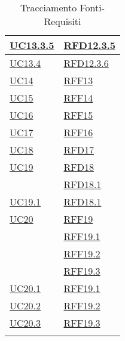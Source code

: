 \begin{longtable}{|>{\centering}m{5cm}|m{5cm}<{\centering}|}
\hyperref[UC13.3.5]{UC13.3.5} & \hyperlink{RFD12.3.5}{RFD12.3.5}\\ \hline
\hyperref[UC13.4]{UC13.4} & \hyperlink{RFD12.3.6}{RFD12.3.6}\\ \hline
\hyperref[UC14]{UC14} & \hyperlink{RFF13}{RFF13}\\ \hline
\hyperref[UC15]{UC15} & \hyperlink{RFF14}{RFF14}\\ \hline
\hyperref[UC16]{UC16} & \hyperlink{RFF15}{RFF15}\\ \hline
\hyperref[UC17]{UC17} & \hyperlink{RFF16}{RFF16}\\ \hline
\hyperref[UC18]{UC18} & \hyperlink{RFD17}{RFD17}\\ \hline
\hyperref[UC19]{UC19} & \hyperlink{RFD18}{RFD18}\\
& \hyperlink{RFD18.1}{RFD18.1}\\ \hline
\hyperref[UC19.1]{UC19.1} & \hyperlink{RFD18.1}{RFD18.1}\\ \hline
\hyperref[UC20]{UC20} & \hyperlink{RFF19}{RFF19}\\
& \hyperlink{RFF19.1}{RFF19.1}\\
& \hyperlink{RFF19.2}{RFF19.2}\\
& \hyperlink{RFF19.3}{RFF19.3}\\ \hline
\hyperref[UC20.1]{UC20.1} & \hyperlink{RFF19.1}{RFF19.1}\\ \hline
\hyperref[UC20.2]{UC20.2} & \hyperlink{RFF19.2}{RFF19.2}\\ \hline
\hyperref[UC20.3]{UC20.3} & \hyperlink{RFF19.3}{RFF19.3}\\ \hline
\caption[Tracciamento Fonti-Requisiti]{Tracciamento Fonti-Requisiti}
\label{tabella:fonti-requi}
\end{longtable}
\clearpage
